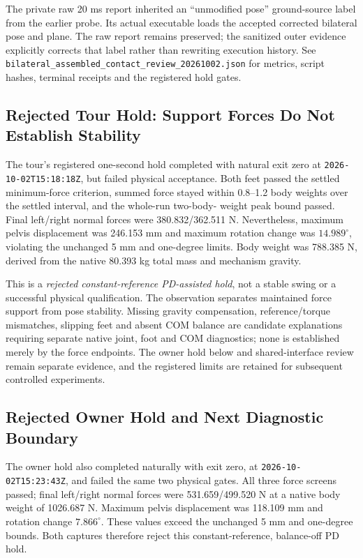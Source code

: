 \documentclass[11pt,a4paper]{article}
\begin{document}
The private raw 20 ms report inherited an ``unmodified pose'' ground-source
label from the earlier probe. Its actual executable loads the accepted
corrected bilateral pose and plane. The raw report remains preserved; the
sanitized outer evidence explicitly corrects that label rather than
rewriting execution history. See
\texttt{bilateral\_assembled\_contact\_review\_20261002.json} for
metrics, script hashes, terminal receipts and the registered hold gates.

\subsection{Rejected Tour Hold: Support Forces Do Not Establish Stability}
The tour's registered one-second hold completed with natural exit zero at
\texttt{2026-10-02T15:18:18Z}, but failed physical acceptance. Both feet
passed the settled minimum-force criterion, summed force stayed within
0.8--1.2 body weights over the settled interval, and the whole-run two-body-
weight peak bound passed. Final left/right normal forces were
380.832/362.511 N. Nevertheless, maximum pelvis displacement was
246.153 mm and maximum rotation change was $14.989^\circ$, violating
the unchanged 5 mm and one-degree limits. Body weight was 788.385 N,
derived from the native 80.393 kg total mass and mechanism gravity.

This is a \emph{rejected constant-reference PD-assisted hold}, not a stable
swing or a successful physical qualification. The observation separates
maintained force support from pose stability. Missing gravity compensation,
reference/torque mismatches, slipping feet and absent COM balance are
candidate explanations requiring separate native joint, foot and COM
diagnostics; none is established merely by the force endpoints. The owner
hold below and shared-interface review remain separate evidence, and the registered
limits are retained for subsequent controlled experiments.

\subsection{Rejected Owner Hold and Next Diagnostic Boundary}
The owner hold also completed naturally with exit zero, at
\texttt{2026-10-02T15:23:43Z}, and failed the same two physical gates.
All three force screens passed; final left/right normal forces were
531.659/499.520 N at a native body weight of 1026.687 N. Maximum pelvis
displacement was 118.109 mm and rotation change $7.866^\circ$.
These values exceed the unchanged 5 mm and one-degree bounds. Both
captures therefore reject this constant-reference, balance-off PD hold.
\end{document}
